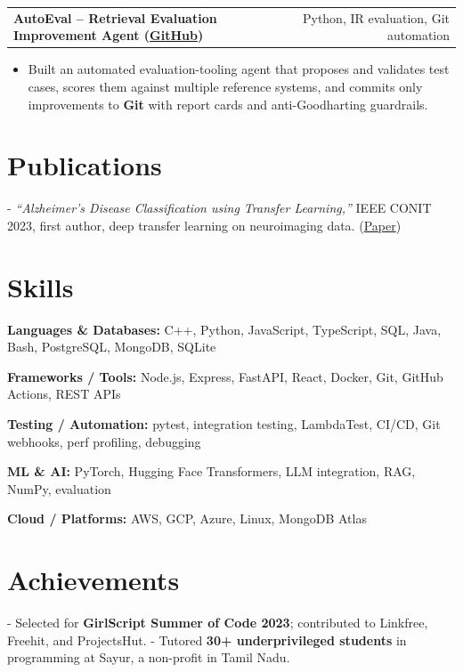 \documentclass[letterpaper,11pt]{article}
\makeatletter
\newcommand{\projItem}[2]{%
  \vspace{6pt}
  \begin{tabular*}{\textwidth}{@{}l@{\extracolsep{\fill}}r@{}}
    \textbf{#1} & #2 \\
  \end{tabular*}\par\vspace{-2pt}
}
\newcommand{\skillLine}[2]{\textbf{#1:} #2\par\vspace{2pt}}
\newcommand{\inlineBlock}[1]{{\setlength{\leftskip}{0.18in}\small #1\par}}
\makeatother
\begin{document}
\projItem{AutoEval -- Retrieval Evaluation Improvement Agent {\normalfont\small(\href{https://github.com/Deva-1903/AutoEval}{GitHub})}}{Python, IR evaluation, Git automation}
\begin{itemize}
  \item Built an automated evaluation-tooling agent that proposes and validates test cases, scores them against multiple reference systems, and commits only improvements to \textbf{Git} with report cards and anti-Goodharting guardrails.
\end{itemize}

\section{Publications}
\inlineBlock{- \textit{``Alzheimer's Disease Classification using Transfer Learning,''} IEEE CONIT 2023, first author, deep transfer learning on neuroimaging data. {\normalfont\small(\href{https://ieeexplore.ieee.org/document/10205760}{Paper})}}

\section{Skills}
\skillLine{Languages \& Databases}{C++, Python, JavaScript, TypeScript, SQL, Java, Bash, PostgreSQL, MongoDB, SQLite}
\skillLine{Frameworks / Tools}{Node.js, Express, FastAPI, React, Docker, Git, GitHub Actions, REST APIs}
\skillLine{Testing / Automation}{pytest, integration testing, LambdaTest, CI/CD, Git webhooks, perf profiling, debugging}
\skillLine{ML \& AI}{PyTorch, Hugging Face Transformers, LLM integration, RAG, NumPy, evaluation}
\skillLine{Cloud / Platforms}{AWS, GCP, Azure, Linux, MongoDB Atlas}

\section{Achievements}
\inlineBlock{- Selected for \textbf{GirlScript Summer of Code 2023}; contributed to Linkfree, Freehit, and ProjectsHut. - Tutored \textbf{30+ underprivileged students} in programming at Sayur, a non-profit in Tamil Nadu.}
\end{document}
